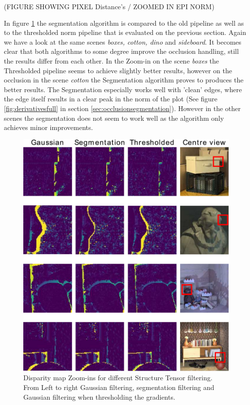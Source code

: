 \documentclass  [
  paper    = a4,
  BCOR     = 10mm,
  twoside,
  fontsize = 12pt,
  fleqn,
  toc      = bibnumbered,
  toc      = listofnumbered,
  numbers  = noendperiod,
  headings = normal,
  listof   = leveldown,
  version  = 3.03
]                                       {scrreprt}
\begin{document}
(FIGURE SHOWING PIXEL Distance's / ZOOMED IN EPI NORM)

In figure \ref{fig:threshresultsmorph} the segmentation algorithm is compared to the old pipeline as well as to the thresholded norm pipeline that is evaluated on the previous section. Again we have a look at the same scenes \textit{boxes, cotton, dino} and \textit{sideboard}. It becomes clear that both algorithms to some degree improve the occlusion handling, still the results differ from each other. In the Zoom-in on the scene \textit{boxes} the Thresholded pipeline seems to achieve slightly better results, however on the occlusion in the scene \textit{cotton} the Segmentation algorithm proves to produces the better results. The Segmentation especially works well with 'clean' edges, where the edge itself results in a clear peak in the norm of the plot (See figure \ref{fig:derivativesfull} in section \ref{sec:occlusionsegmentation}). However in the other scenes the segmentation does not seem to work well as the algorithm only achieves minor improvements.


\begin{figure}
	\centering
	\includegraphics[width=1\linewidth]{images/thresh_results_morph-eps-converted-to.pdf}
	\caption[Disparity map Zoom-ins for different methods]{Disparity map Zoom-ins for different Structure Tensor filtering. From Left to right Gaussian filtering, segmentation filtering and Gaussian filtering when thresholding the gradients.}
	\label{fig:threshresultsmorph}
\end{figure}
\end{document}
